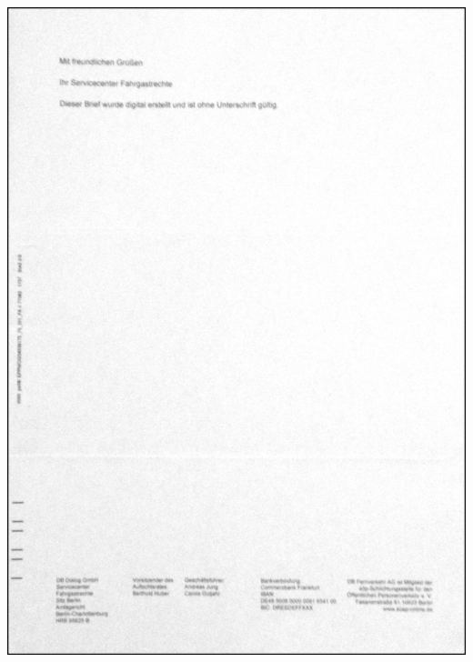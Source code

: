 \documentclass{beamer}
\begin{document}
	\begin{frame}[plain]
		\begin{center}
			\includegraphics[height=1.2\textheight]{images/bahn-brief-page-2}
		\end{center}
	\end{frame}
\end{document}
